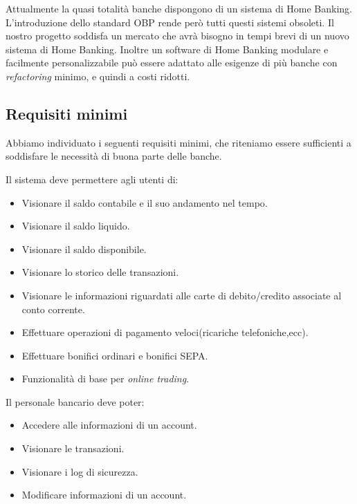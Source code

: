 \documentclass[10pt]{softeng} %
\begin{document}
Attualmente la quasi totalit\`a banche dispongono di un sistema di Home Banking.
L'introduzione dello standard OBP rende per\`o tutti questi sistemi obsoleti.
Il nostro progetto soddisfa un mercato che avr\`a bisogno in tempi brevi di un nuovo sistema di Home Banking.
Inoltre un software di Home Banking modulare e facilmente personalizzabile pu\`o essere adattato alle esigenze di pi\`u banche con \emph{refactoring} minimo, e quindi a costi ridotti.

\subsection{Requisiti minimi}

Abbiamo individuato i seguenti requisiti minimi, che riteniamo essere sufficienti a soddisfare le necessit\`a di buona parte delle banche.

Il sistema deve permettere agli utenti di:
\begin{itemize}
    \item Visionare il saldo contabile e il suo andamento nel tempo.
    \item Visionare il saldo liquido.
    \item Visionare il saldo disponibile.
    \item Visionare lo storico delle transazioni.
    \item Visionare le informazioni riguardati alle carte di debito/credito associate al conto corrente.
    \item Effettuare operazioni di pagamento veloci(ricariche telefoniche,ecc).
    \item Effettuare bonifici ordinari e bonifici SEPA.
    \item Funzionalit\`a di base per \emph{online trading}.
\end{itemize}

Il personale bancario deve poter:
\begin{itemize}
    \item Accedere alle informazioni di un account.
    \item Visionare le transazioni.
    \item Visionare i log di sicurezza.
    \item Modificare informazioni di un account.

\end{itemize}

\end{document}
